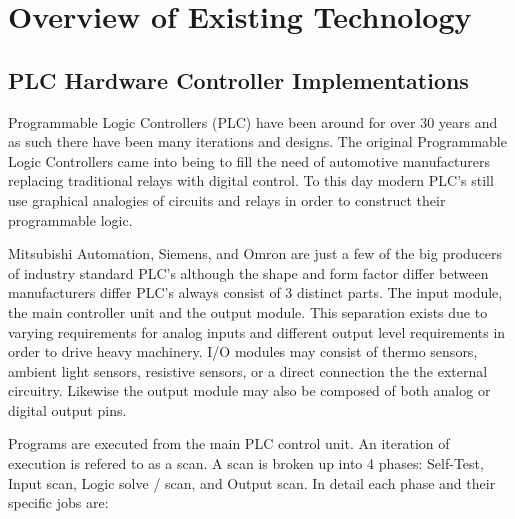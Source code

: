 
\chapter{Overview of Existing Technology}
\section{PLC Hardware Controller Implementations}
Programmable Logic Controllers (PLC) have been around for over 30 years and as such there have been many iterations and designs. The original Programmable Logic Controllers came into being to fill the need of automotive manufacturers replacing traditional relays with digital control. To this day modern PLC's still use graphical analogies of circuits and relays in order to construct their programmable logic.

Mitsubishi Automation, Siemens, and Omron are just a few of the big producers of industry standard PLC's although the shape and form factor differ between manufacturers differ PLC's always consist of 3 distinct parts.  The input module, the main controller unit and the output module. This separation exists due to varying requirements for analog inputs and different output level requirements in order to drive heavy machinery. I/O modules may consist of thermo sensors, ambient light sensors, resistive sensors, or a direct connection the the external circuitry. Likewise the output module may also be composed of both analog or digital output pins.

Programs are executed from the main PLC control unit. An iteration of execution is refered to as a scan. A scan is broken up into 4 phases: Self-Test, Input scan, Logic solve / scan, and Output scan. In detail each phase and their specific jobs are:


